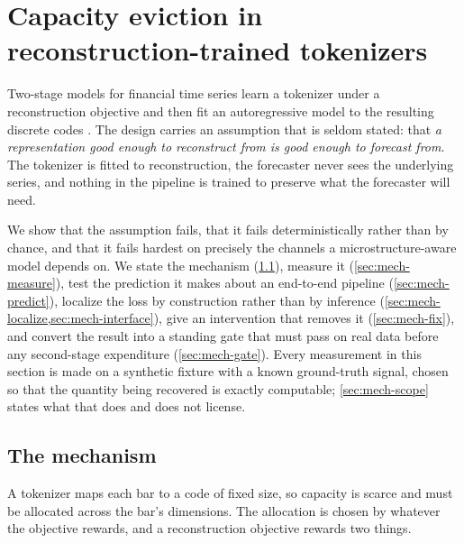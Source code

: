 \section{Capacity eviction in reconstruction-trained tokenizers}
\label{sec:mechanism}

Two-stage models for financial time series learn a tokenizer under a reconstruction objective and
then fit an autoregressive model to the resulting discrete codes
\citep{shi2025kronos,oord2017vqvae}. The design carries an assumption that is seldom stated: that
\emph{a representation good enough to reconstruct from is good enough to forecast from}. The
tokenizer is fitted to reconstruction, the forecaster never sees the underlying series, and nothing
in the pipeline is trained to preserve what the forecaster will need.

We show that the assumption fails, that it fails deterministically rather than by chance, and that
it fails hardest on precisely the channels a microstructure-aware model depends on. We state the
mechanism (\cref{sec:mech-claim}), measure it (\cref{sec:mech-measure}), test the prediction it
makes about an end-to-end pipeline (\cref{sec:mech-predict}), localize the loss by construction
rather than by inference (\cref{sec:mech-localize,sec:mech-interface}), give an intervention that
removes it (\cref{sec:mech-fix}), and convert the result into a standing gate that must pass on
real data before any second-stage expenditure (\cref{sec:mech-gate}). Every measurement in this
section is made on a synthetic fixture with a known ground-truth signal, chosen so that the
quantity being recovered is exactly computable; \cref{sec:mech-scope} states what that does and
does not license.

\subsection{The mechanism}
\label{sec:mech-claim}

A tokenizer maps each bar to a code of fixed size, so capacity is scarce and must be allocated
across the bar's dimensions. The allocation is chosen by whatever the objective rewards, and a
reconstruction objective rewards two things.

